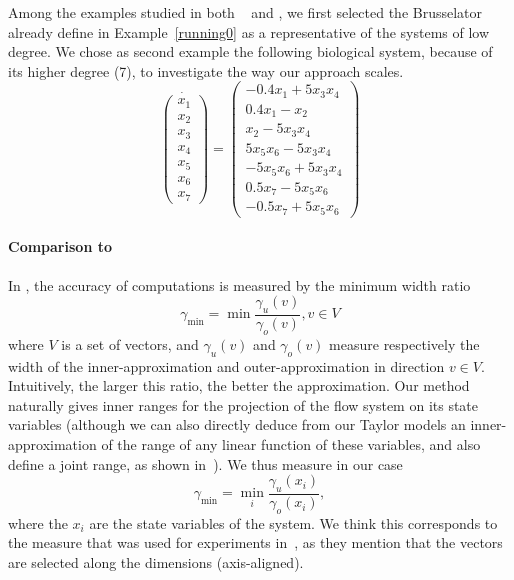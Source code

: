 Among the examples studied in both ~\cite{Underapproxflowpipes} and \cite{underapprox16}, we first selected
the Brusselator already define in Example~\ref{running0} as a representative of the systems of low degree. 
We chose as second example the following biological system, because of its higher degree (7), to investigate the way our approach scales. 
\begin{equation}
\dot{\left(\begin{array}{c}
x_1 \\
x_2 \\
x_3 \\
x_4 \\
x_5 \\
x_6 \\
x_7
\end{array}\right)} = \left(\begin{array}{c}
-0.4x_1+5x_3x_4 \\
0.4x_1-x_2 \\
x_2-5x_3x_4 \\
5x_5x_6-5x_3x_4 \\
-5x_5x_6+5x_3x_4 \\
0.5x_7-5x_5x_6 \\
-0.5x_7+5x_5x_6
\end{array}\right)
\end{equation}

\paragraph{Comparison to \cite{Underapproxflowpipes}}
In  \cite{Underapproxflowpipes}, the  accuracy of computations is measured by the minimum width ratio 
\[ \gamma_{\min}=\min{\frac{\gamma_u(v)}{\gamma_o(v)}}, v \in V \]
where $V$ is a set of vectors, and $\gamma_u(v)$ and $\gamma_o(v)$ measure respectively the width of the inner-approximation and outer-approximation
in direction $v \in V$. 
Intuitively, the larger this ratio, the better the approximation. 
Our method naturally gives inner ranges for the projection of the flow system on its state variables (although we can also directly deduce from our Taylor models 
an inner-approximation of the range of any linear function of these variables, and also define a joint range, as shown in~\cite{hscc14,rc13}).
We thus measure in our case \[ \gamma_{\min}=\min_{i}{\frac{\gamma_u(x_i)}{\gamma_o(x_i)}}, \]
where the $x_i$ are the state variables of the system. We think this corresponds to the measure that was used for experiments 
in~\cite{Underapproxflowpipes}, as they mention that the vectors are selected along the dimensions (axis-aligned).

